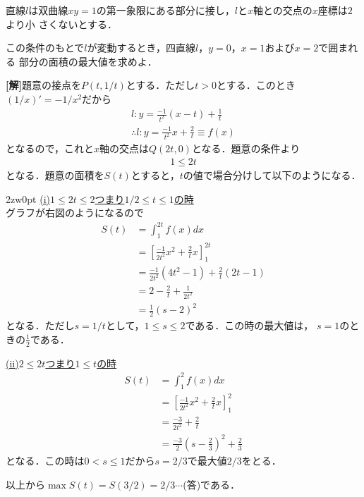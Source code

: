\documentclass[a4j]{jarticle}
\begin{document}

     \begin{oframed}
     直線$l$は双曲線$xy=1$の第一象限にある部分に接し，$l$と$x$軸との交点の$x$座標は$2$より小
     さくないとする．
     
     この条件のもとで$l$が変動するとき，四直線$l$，$y=0$，$x=1$および$x=2$で囲まれる
     部分の面積の最大値を求めよ．
     \end{oframed}

\setlength{\columnseprule}{0.4pt}
\begin{multicols}{2}
{\bf[解]}題意の接点を$P(t,1/t)$とする．ただし$t>0$とする．このとき$(1/x)'=-1/x^2$だから
     \begin{align*}
     l:y=\frac{-1}{t^2}(x-t)+\frac{1}{t} \\
     \therefore l:y=\frac{-1}{t^2}x+\frac{2}{t}\equiv f(x)
     \end{align*}
となるので，これと$x$軸の交点は$Q(2t,0)$となる．題意の条件より
     \begin{align}
     1\le2t\label{1}
     \end{align}
となる．題意の面積を$S(t)$とすると，$t$の値で場合分けして以下のようになる．
     \begin{indentation}{2zw}{0pt}
     \noindent \underline{(i)$1\le2t\le2$つまり$1/2\le t\le 1$の時}　　\\
     グラフが右図のようになるので
          \begin{align*}
          S(t)&=\int_1^{2t}f(x)dx  \\
          &=\left[\frac{-1}{2t^2}x^2+\frac{2}{t}x\right]_1^{2t} \\
          &=\frac{-1}{2t^2}(4t^2-1)+\frac{2}{t}(2t-1)  \\
          &=2-\frac{2}{t}+\frac{1}{2t^2}　　\\
          &=\frac{1}{2}(s-2)^2
          \end{align*}
     となる．ただし$s=1/t$として，$1\le s\le2$である．この時の最大値は，
     $s=1$のときの$\frac{1}{2}$である．     
     
     \noindent \underline{(ii)$2\le2t$つまり$1\le t$の時}　　\\
          \begin{align*}
          S(t)&=\int_1^2f(x)dx \\
          &=\left[\frac{-1}{2t^2}x^2+\frac{2}{t}x\right]_1^2  \\
          &=\frac{-3}{2t^2}+\frac{2}{t}　　\\
          &=\frac{-3}{2}\left(s-\frac{2}{3}\right)^2+\frac{2}{3}
          \end{align*}
      となる．この時は$0<s\le1$だから$s=2/3$で最大値$2/3$をとる．
     \end{indentation}          
以上から$\max S(t)=S(3/2)=2/3\cdots$(答)である．
\newpage
\end{multicols}
\end{document}
